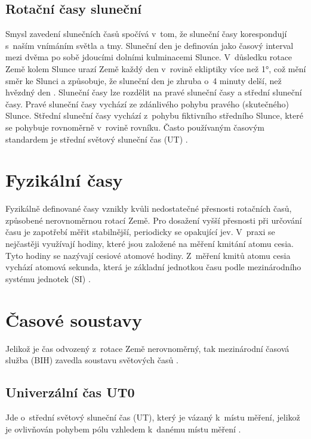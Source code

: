 \subsection{Rotační časy sluneční}
Smysl zavedení slunečních časů spočívá v~tom, že sluneční časy korespondují s~naším vnímáním světla a tmy. Sluneční den je definován jako časový interval mezi dvěma po sobě jdoucími dolními kulminacemi Slunce. V~důsledku rotace Země kolem Slunce urazí Země každý den v~rovině ekliptiky více než 1°, což mění směr ke Slunci a způsobuje, že sluneční den je zhruba o~4 minuty delší, než hvězdný den \cite{fixel_geodeticka_astronomie}. Sluneční časy lze rozdělit na pravé sluneční časy a střední sluneční časy. Pravé sluneční časy vychází ze zdánlivého pohybu pravého (skutečného) Slunce. Střední sluneční časy vychází z~pohybu fiktivního středního Slunce, které se pohybuje rovnoměrně v~rovině rovníku. Často používaným časovým standardem je střední světový sluneční čas (UT) \cite{kostelecky_geodeticka_astronomie}.

\section{Fyzikální časy}
Fyzikálně definované časy vznikly kvůli nedostatečné přesnosti rotačních časů, způ\-sobené nerovnoměrnou rotací Země. Pro dosažení vyšší přesnosti při určování času je zapotřebí měřit stabilnější, periodicky se opakující jev. V~praxi se nejčastěji využívají hodiny, které jsou založené na měření kmitání atomu cesia. Tyto hodiny se nazývají cesiové atomové hodiny. Z~měření kmitů atomu cesia vychází atomová sekunda, která je základní jednotkou času podle mezinárodního systému jednotek (SI) \cite{kostelecky_geodeticka_astronomie}.

\section{Časové soustavy}%
Jelikož je čas odvozený z~rotace Země nerovnoměrný, tak mezinárodní časová služba (BIH) zavedla soustavu světových časů \cite{fixel_geodeticka_astronomie}.

\subsection{Univerzální čas UT0}
Jde o~střední světový sluneční čas (UT), který je vázaný k~místu měření, jelikož je ovlivňován pohybem pólu vzhledem k~danému místu měření \cite{kostelecky_geodeticka_astronomie}.

